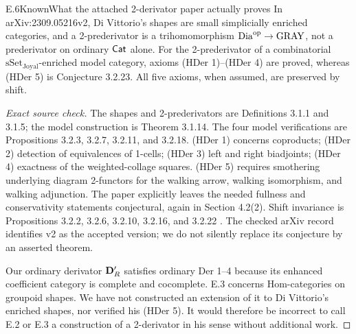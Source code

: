 \begin{claim}{E.6}{Known}{What the attached 2-derivator paper actually proves}
In arXiv:2309.05216v2, Di Vittorio's shapes are small simplicially
enriched categories, and a 2-prederivator is a trihomomorphism
$\mathrm{Dia}^{\mathrm{op}}\to\mathrm{GRAY}$, not a prederivator on
ordinary $\mathsf{Cat}$ alone.  For the 2-prederivator of a combinatorial
$\mathrm{sSet}_{\mathrm{Joyal}}$-enriched model category, axioms
(HDer 1)--(HDer 4) are proved, whereas (HDer 5) is Conjecture 3.2.23.
All five axioms, when assumed, are preserved by shift.
\end{claim}
\begin{proof}[Exact source check]
The shapes and 2-prederivators are Definitions 3.1.1 and 3.1.5; the
model construction is Theorem 3.1.14.  The four model verifications
are Propositions 3.2.3, 3.2.7, 3.2.11, and 3.2.18.
(HDer 1) concerns coproducts; (HDer 2) detection of equivalences of
1-cells; (HDer 3) left and right biadjoints; (HDer 4) exactness of the
weighted-collage squares.  (HDer 5) requires smothering underlying
diagram 2-functors for the walking arrow, walking isomorphism, and
walking adjunction.  The paper explicitly leaves the needed fullness
and conservativity statements conjectural, again in Section 4.2(2).
Shift invariance is Propositions 3.2.2, 3.2.6, 3.2.10, 3.2.16, and
3.2.22 \citep{EF_DiVittorio2026}.  The checked arXiv record identifies
v2 as the accepted version; we do not silently replace its conjecture
by an asserted theorem.

Our ordinary derivator $\mathbf D'_R$ satisfies ordinary Der 1--4 because
its enhanced coefficient category is complete and cocomplete.  E.3
concerns Hom-categories on groupoid shapes.  We have not constructed
an extension of it to Di Vittorio's enriched shapes, nor verified
his (HDer 5).  It would therefore be incorrect to call E.2 or E.3
a construction of a 2-derivator in his sense without additional work.
\end{proof}

